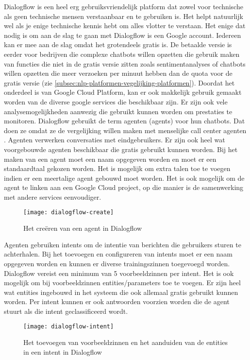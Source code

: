 Dialogflow is een heel erg gebruiksvriendelijk platform dat zowel voor technische als geen technische mensen verstaanbaar en te gebruiken is. Het helpt natuurlijk wel als je enige technische kennis hebt om alles vlotter te verstaan. Het enige dat nodig is om aan de slag te gaan met Dialogflow is een Google account. Iedereen kan er mee aan de slag omdat het grotendeels gratis is. De betaalde versie is eerder voor bedrijven die complexe chatbots willen opzetten die gebruik maken van functies die niet in de gratis versie zitten zoals sentimentanalyses of chatbots willen opzetten die meer verzoeken per minuut hebben dan de quota voor de gratis versie (zie \ref{subsec:nlp-platformen-vegelijking-platformen}). Doordat het onderdeel is van Google Cloud Platform, kan er ook makkelijk gebruik gemaakt worden van de diverse google services die beschikbaar zijn. Er zijn ook vele analysemogelijkheden aanwezig die gebruikt kunnen worden om prestaties te monitoren. Dialogflow gebruikt de term agenten (agents) voor hun chatbots. Dat doen ze omdat ze de vergelijking willen maken met menselijke call center agenten \autocite{GoogleCloud2020}. Agenten verwerken conversaties met eindgebruikers. Er zijn ook heel wat voorgebouwde agenten beschikbaar die gratis gebruikt kunnen worden. Bij het maken van een agent moet een naam opgegeven worden en moet er een standaardtaal gekozen worden. Het is mogelijk om extra talen toe te voegen indien er een meertalige agent gebouwd moet worden. Het is ook mogelijk om de agent te linken aan een Google Cloud project, op die manier is de samenwerking met andere services eenvoudiger. 

\begin{figure}[H]
    \label{fig:dialogflow-create}
    \centering
    \texttt{[image: dialogflow-create]}
    \caption{Het creëren van een agent in Dialogflow}
\end{figure}

Agenten gebruiken intents om de intentie van berichten die gebruikers sturen te achterhalen. Bij het toevoegen en configureren van intents moet er een naam opgegeven worden en kunnen er diverse trainingszinnen toegevoegd worden. Dialogflow vereist een minimum van 5 voorbeeldzinnen per intent. Het is ook mogelijk om bij voorbeeldzinnen entities/parameters toe te voegen. Er zijn heel wat entities ingebouwd in het systeem die ook allemaal gratis gebruikt kunnen worden. Per intent kunnen er ook antwoorden voorzien worden die de agent stuurt als die intent geclassificeerd wordt.

\begin{figure}[H]
    \label{fig:dialogflow-intent}
    \centering
    \texttt{[image: dialogflow-intent]}
    \caption{Het toevoegen van voorbeeldzinnen en het aanduiden van de entities in een intent in Dialogflow}
\end{figure}

